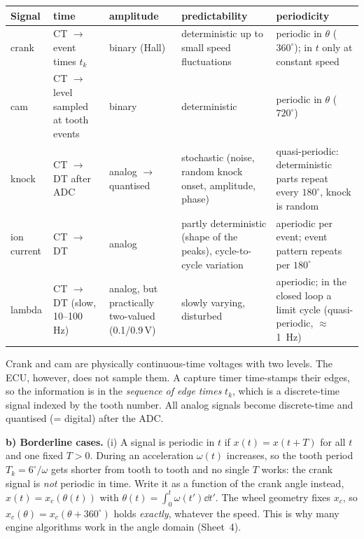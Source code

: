 \begin{solution}
\begin{center}
\small
\begin{tabularx}{\textwidth}{@{}l>{\raggedright\arraybackslash}p{2.6cm}>{\raggedright\arraybackslash}p{2.3cm}>{\raggedright\arraybackslash}p{3.3cm}>{\raggedright\arraybackslash}X@{}}
\toprule
Signal & time & amplitude & predictability & periodicity \\
\midrule
crank & CT $\to$ event times $t_k$ & binary (Hall) & deterministic up to small
  speed fluctuations & periodic in $\theta$ ($360^\circ$); in $t$ only at constant speed \\
cam & CT $\to$ level sampled at tooth events & binary & deterministic &
  periodic in $\theta$ ($720^\circ$) \\
knock & CT $\to$ DT after ADC & analog $\to$ quantised & stochastic (noise,
  random knock onset, amplitude, phase) & quasi-periodic: deterministic parts
  repeat every $180^\circ$, knock is random \\
ion current & CT $\to$ DT & analog & partly deterministic (shape of the
  peaks), cycle-to-cycle variation & aperiodic per event; event pattern
  repeats per $180^\circ$ \\
lambda & CT $\to$ DT (slow, 10--100\,Hz) & analog, but practically
  two-valued (0.1/0.9\,V) & slowly varying, disturbed & aperiodic; in the
  closed loop a limit cycle (quasi-periodic, $\approx$\SI{1}{Hz}) \\
\bottomrule
\end{tabularx}
\end{center}
Crank and cam are physically continuous-time voltages with two levels. The
ECU, however, does not sample them. A capture timer time-stamps their edges,
so the information is in the \emph{sequence of edge times} $t_k$, which is a
discrete-time signal indexed by the tooth number. All analog signals become
discrete-time and quantised (= digital) after the ADC.

\textbf{b) Borderline cases.}
(i) A signal is periodic in $t$ if $x(t)=x(t+T)$ for all $t$ and one fixed
$T>0$. During an acceleration $\omega(t)$ increases, so the tooth period
$T_k=6^\circ/\omega$ gets shorter from tooth to tooth and no single $T$
works: the crank signal is \emph{not} periodic in time. Write it as a
function of the crank angle instead, $x(t)=x_c(\theta(t))$ with
$\theta(t)=\int_0^t\omega(t')\dd t'$. The wheel geometry fixes $x_c$, so
$x_c(\theta)=x_c(\theta+360^\circ)$ holds \emph{exactly}, whatever the speed.
This is why many engine algorithms work in the angle domain (Sheet~4).


\end{solution}
